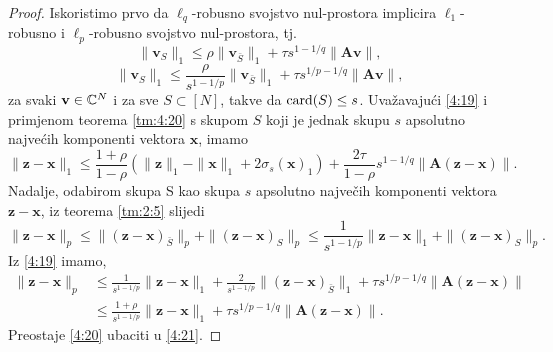 \documentclass[a4paper,twoside,12pt]{memoir} %
\newcommand{\vect}[1]{\mathbf{#1}}
\renewcommand{\vec}{\vect}
\newcommand{\card}{\text{\normalfont{card}}}
\newcommand{\norm}[1]{\|{#1}\|}
\begin{document}
\begin{proof}
    Iskoristimo prvo da $\ell_q$-robusno svojstvo nul-prostora implicira $\ell_1$-robusno i $\ell_p$-robusno svojstvo nul-prostora, tj.
    \begin{equation}\label{4:18}
        \norm{\vec v_S}_1 \leq \rho \norm{\vec v_{\bar S}}_1 + \tau s^{1-1/q} \norm{\vec{Av}},
    \end{equation}
    \begin{equation}\label{4:19}
        \norm{\vec v_S}_1 \leq \frac{\rho}{s^{1-1/p}} \norm{\vec v_{\bar S}}_1 + \tau s^{1/p - 1/q} \norm{\vec{Av}},
    \end{equation}
    za svaki $\vec v \in \C^N$ i za sve $S \subset [N]$, takve da $\card(S) \leq s$. Uva\v{z}avaju\'ci \eqref{4:19} i primjenom teorema \ref{tm:4:20} s skupom $S$ koji je jednak skupu $s$ apsolutno najve\'cih komponenti vektora $\vec x$, imamo
    \begin{equation}\label{4:20}
        \norm{\vec z - \vec x}_1 \leq \frac{1+\rho}{1-\rho}(\norm{\vec z }_1 - \norm{\vec x}_1 + 2 \sigma_s(\vec x)_1)+ \frac{2 \tau}{1 - \rho}s^{1-1/q} \norm{\vec A (\vec z - \vec x)}.
    \end{equation}
    Nadalje, odabirom skupa S kao skupa $s$ apsolutno najve\v{c}ih komponenti vektora $\vec z - \vec x$, iz teorema \ref{tm:2:5} slijedi
    \begin{equation*}
        \norm{\vec z - \vec x}_p \leq \norm{(\vec z - \vec x)_{\bar S}}_p + \norm{(\vec z - \vec x)_S}_p \leq \frac{1}{s^{1-1/p}}\norm{\vec z - \vec x}_1 + \norm{(\vec z - \vec x)_S}_p.
    \end{equation*}
    Iz \eqref{4:19} imamo,
    \begin{align}\label{4:21}
        \norm{\vec z - \vec x}_p &\leq \frac{1}{s^{1-1/p}} \norm{\vec z - \vec x}_1 + \frac{2}{s^{1-1/p}} \norm{(\vec z - \vec x)_{\bar S}}_1 + \tau s^{1/p - 1/q} \norm{\vec A (\vec z - \vec x)}\nonumber \\
        &\leq  \frac{1+\rho}{s^{1-1/p}}  \norm{\vec z - \vec x}_1 + \tau s^{1/p - 1/q} \norm{ \vec A (\vec z - \vec x)}.
    \end{align}
    Preostaje \eqref{4:20} ubaciti u \eqref{4:21}.
\end{proof}
\end{document}
